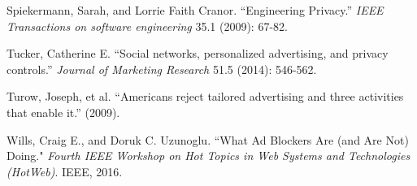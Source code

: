 \documentclass[conference]{IEEEtran}
\begin{document}
\begin{thebibliography}{99}
 Spiekermann, Sarah, and Lorrie Faith Cranor. “Engineering Privacy.” \textit{IEEE Transactions on software engineering} 35.1 (2009): 67-82.

 Tucker, Catherine E. “Social networks, personalized advertising, and privacy controls.” \textit{Journal of Marketing Research} 51.5 (2014): 546-562.

 Turow, Joseph, et al. “Americans reject tailored advertising and three activities that enable it.” (2009).

 Wills, Craig E., and Doruk C. Uzunoglu. “What Ad Blockers Are (and Are Not) Doing." \textit{Fourth IEEE Workshop on Hot Topics in Web Systems and Technologies (HotWeb)}. IEEE, 2016.


\end{thebibliography}
\end{document}
